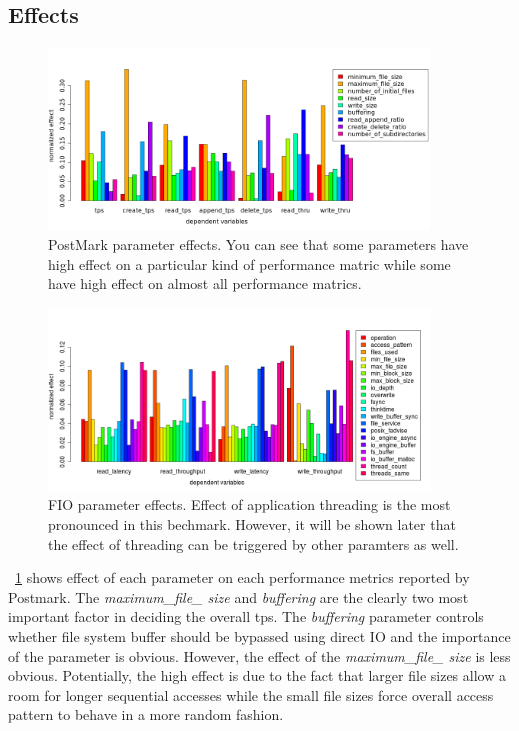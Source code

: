 \subsection{Effects}
\begin{figure}[!t]
\centering
\includegraphics[width=0.9\textwidth]{figure/pm_effect.png}
\captionsetup{format=myformat}
\caption{PostMark parameter effects. 
You can see that some parameters have high effect on a particular kind of performance matric while some have high effect on almost all performance matrics.}
\label{pm_effect}
\end{figure}

\begin{figure}[!t]
\centering
\includegraphics[width=0.9\textwidth]{figure/fio_effect.png}
\captionsetup{format=myformat}
\caption{FIO parameter effects. 
Effect of application threading is the most pronounced in this bechmark. 
However, it will be shown later that the effect of threading can be triggered by other paramters as well.}
\label{fio_effect}
\end{figure}

\figurename~\ref{pm_effect} shows effect of each parameter on each performance metrics reported by Postmark. 
The \emph{maximum\_file\_ size} and \emph{buffering} are the clearly two most important factor in deciding the overall tps. 
The \emph{buffering} parameter controls whether file system buffer should be bypassed using direct IO and the importance of the parameter is obvious. 
However, the effect of the \emph{maximum\_file\_ size} is less obvious. 
Potentially, the high effect is due to the fact that larger file sizes allow a room for longer sequential accesses while the small file sizes force overall access pattern to behave in a more random fashion. 

